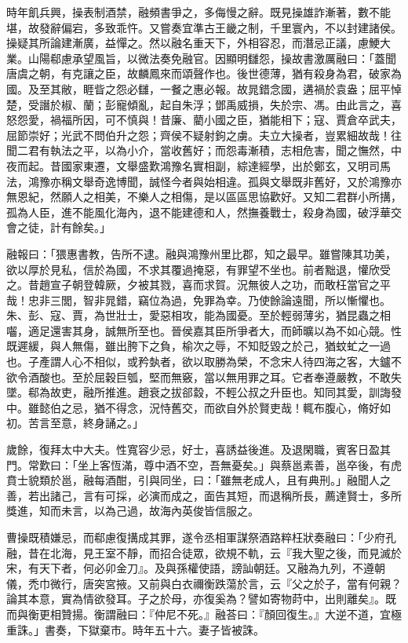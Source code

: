 \begin{pinyinscope}
時年飢兵興，操表制酒禁，融頻書爭之，多侮慢之辭。既見操雄詐漸著，數不能堪，故發辭偏宕，多致乖忤。又嘗奏宜準古王畿之制，千里寰內，不以封建諸侯。操疑其所論建漸廣，益憚之。然以融名重天下，外相容忍，而潛忌正議，慮鯁大業。山陽郗慮承望風旨，以微法奏免融官。因顯明讎怨，操故書激厲融曰：「蓋聞唐虞之朝，有克讓之臣，故麟鳳來而頌聲作也。後世德薄，猶有殺身為君，破家為國。及至其敝，睚眥之怨必讎，一餐之惠必報。故晁錯念國，遘禍於袁盎；屈平悼楚，受譖於椒、蘭；彭寵傾亂，起自朱浮；鄧禹威損，失於宗、馮。由此言之，喜怒怨愛，禍福所因，可不慎與！昔廉、藺小國之臣，猶能相下；寇、賈倉卒武夫，屈節崇好；光武不問伯升之怨；齊侯不疑射鉤之虜。夫立大操者，豈累細故哉！往聞二君有執法之平，以為小介，當收舊好；而怨毒漸積，志相危害，聞之憮然，中夜而起。昔國家東遷，文舉盛歎鴻豫名實相副，綜達經學，出於鄭玄，又明司馬法，鴻豫亦稱文舉奇逸博聞，誠怪今者與始相違。孤與文舉既非舊好，又於鴻豫亦無恩紀，然願人之相美，不樂人之相傷，是以區區思協歡好。又知二君群小所搆，孤為人臣，進不能風化海內，退不能建德和人，然撫養戰士，殺身為國，破浮華交會之徒，計有餘矣。」

融報曰：「猥惠書教，告所不逮。融與鴻豫州里比郡，知之最早。雖嘗陳其功美，欲以厚於見私，信於為國，不求其覆過掩惡，有罪望不坐也。前者黜退，懽欣受之。昔趙宣子朝登韓厥，夕被其戮，喜而求賀。況無彼人之功，而敢枉當官之平哉！忠非三閭，智非晁錯，竊位為過，免罪為幸。乃使餘論遠聞，所以慚懼也。朱、彭、寇、賈，為世壯士，愛惡相攻，能為國憂。至於輕弱薄劣，猶昆蟲之相囓，適足還害其身，誠無所至也。晉侯嘉其臣所爭者大，而師曠以為不如心競。性既遲緩，與人無傷，雖出胯下之負，榆次之辱，不知貶毀之於己，猶蚊虻之一過也。子產謂人心不相似，或矜埶者，欲以取勝為榮，不念宋人待四海之客，大鑪不欲令酒酸也。至於屈穀巨瓠，堅而無竅，當以無用罪之耳。它者奉遵嚴教，不敢失墜。郗為故吏，融所推進。趙衰之拔郤縠，不輕公叔之升臣也。知同其愛，訓誨發中。雖懿伯之忌，猶不得念，況恃舊交，而欲自外於賢吏哉！輒布腹心，脩好如初。苦言至意，終身誦之。」

歲餘，復拜太中大夫。性寬容少忌，好士，喜誘益後進。及退閑職，賓客日盈其門。常歎曰：「坐上客恆滿，尊中酒不空，吾無憂矣。」與蔡邕素善，邕卒後，有虎賁士貌類於邕，融每酒酣，引與同坐，曰：「雖無老成人，且有典刑。」融聞人之善，若出諸己，言有可採，必演而成之，面告其短，而退稱所長，薦達賢士，多所獎進，知而未言，以為己過，故海內英俊皆信服之。

曹操既積嫌忌，而郗慮復搆成其罪，遂令丞相軍謀祭酒路粹枉狀奏融曰：「少府孔融，昔在北海，見王室不靜，而招合徒眾，欲規不軌，云『我大聖之後，而見滅於宋，有天下者，何必卯金刀』。及與孫權使語，謗訕朝廷。又融為九列，不遵朝儀，禿巾微行，唐突宮掖。又前與白衣禰衡跌蕩於言，云『父之於子，當有何親？論其本意，實為情欲發耳。子之於母，亦復奚為？譬如寄物莳中，出則離矣』。既而與衡更相贊揚。衡謂融曰：『仲尼不死。』融荅曰：『顏回復生。』大逆不道，宜極重誅。」書奏，下獄棄市。時年五十六。妻子皆被誅。


\end{pinyinscope}

